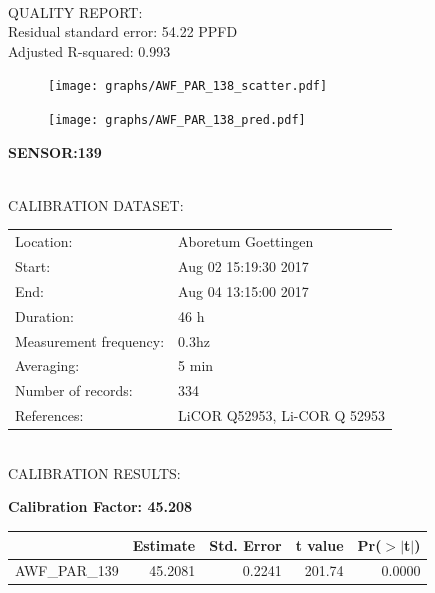 \documentclass[oneside]{report}
\begin{document}
\hrulefill\\
QUALITY REPORT:\\
Residual standard error: 54.22 PPFD\\
Adjusted R-squared: 0.993



\begin{figure}[H]
  \centering
  \texttt{[image: graphs/AWF\_PAR\_138\_scatter.pdf]}
\end{figure}




\begin{figure}[H]
  \centering
  \texttt{[image: graphs/AWF\_PAR\_138\_pred.pdf]}
\end{figure}

\pagebreak


\begin{center}
\large{\textbf{SENSOR:139}}\\
\end{center}

\hrulefill\\
CALIBRATION DATASET:\\
\begin{table}[h!]
  \centering
  \label{tab:table1}
  \begin{tabular}{ll}
    Location: & Aboretum Goettingen\\ 
    
    
    Start:  & Aug 02 15:19:30 2017 \\
    End:   & Aug 04 13:15:00 2017\\ 
    Duration: & 46 h\\
    Measurement frequency: & 0.3hz\\
    Averaging:  &5 min\\
    Number of records: & 334 \\
    References: & LiCOR Q52953, Li-COR Q 52953 \\
  \end{tabular}
\end{table}

\hrulefill\\
CALIBRATION RESULTS:\\


\begin{center}
\textbf{\large{Calibration Factor: 45.208}}\\
\end{center}
\begin{table}[ht]
\centering
\begin{tabular}{rrrrr}
  \hline
 & Estimate & Std. Error & t value & Pr($>$$|$t$|$) \\ 
  \hline
AWF\_PAR\_139 & 45.2081 & 0.2241 & 201.74 & 0.0000 \\ 
   \hline
\end{tabular}
\end{table}
\end{document}
